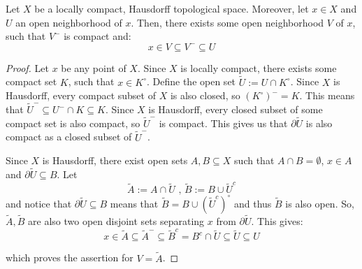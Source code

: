 \begin{lemma}\label{lem:smaller_compact_nbh} Let $X$ be a locally compact, Hausdorff topological space. Moreover, let $x\in X$ and $U$ an open neighborhood of $x$. Then, there exists some open neighborhood $V$ of $x$, such that $V^-$ is compact and:
\[x\in V\subseteq V^-\subseteq U\]
\end{lemma}
\begin{proof} Let $x$ be any point of $X$. Since $X$ is locally compact, there exists some compact set $K$, such that $x\in K^{\circ}$. Define the open set $\tilde{U}:=U\cap K^{\circ}$. Since $X$ is Hausdorff, every compact subset of $X$ is also closed, so $(K^{\circ})^-=K$. This means that $\tilde{U}^-\subseteq U^-\cap K\subseteq K$. Since $X$ is Hausdorff, every closed subset of some compact set is also compact, so $\tilde{U}^-$ is compact. This gives us that $\partial\tilde{U}$ is also compact as a closed subset of $\tilde{U}^-$.

\begin{minipage}{.5\linewidth}
Since $X$ is Hausdorff, there exist open sets $A,B\subseteq X$ such that $A\cap B=\emptyset$, $x\in A$ and $\partial\tilde{U}\subseteq B$. Let
\[\tilde{A}:=A\cap\tilde{U}\text{ , }\tilde{B}:=B\cup\tilde{U}^c\]
and notice that $\partial\tilde{U}\subseteq B$ means that $\tilde{B}=B\cup(\tilde{U}^c)^{\circ}$ and thus $\tilde{B}$ is also open. So, $\tilde{A},\tilde{B}$ are also two open disjoint sets separating $x$ from $\partial\tilde{U}$. This gives:
\[x\in\tilde{A}\subseteq\tilde{A}^-\subseteq\tilde{B}^c=B^c\cap\tilde{U}\subseteq\tilde{U}\subseteq U\]
\end{minipage}%
\begin{minipage}{.5\linewidth}
\begin{center}
\end{center}
\end{minipage}

which proves the assertion for $V=\tilde{A}$.
\end{proof}
